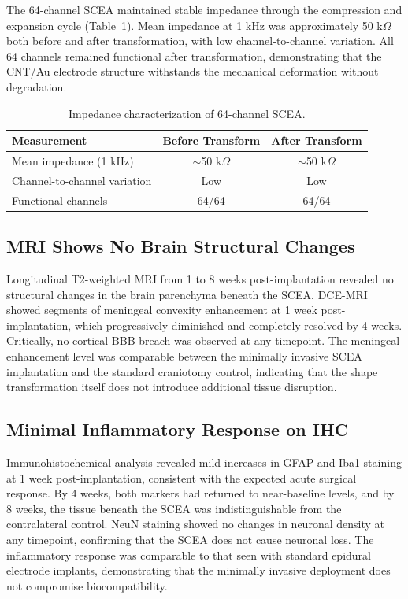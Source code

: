 \documentclass[11pt]{article}
\begin{document}
The 64-channel SCEA maintained stable impedance through the compression and expansion cycle (Table~\ref{tab:impedance}). Mean impedance at 1 kHz was approximately 50 k$\Omega$ both before and after transformation, with low channel-to-channel variation. All 64 channels remained functional after transformation, demonstrating that the CNT/Au electrode structure withstands the mechanical deformation without degradation.

\begin{table}[h]
\centering
\caption{Impedance characterization of 64-channel SCEA.}
\label{tab:impedance}
\begin{tabular}{lcc}
\toprule
Measurement & Before Transform & After Transform \\
\midrule
Mean impedance (1 kHz) & $\sim$50 k$\Omega$ & $\sim$50 k$\Omega$ \\
Channel-to-channel variation & Low & Low \\
Functional channels & 64/64 & 64/64 \\
\bottomrule
\end{tabular}
\end{table}

\subsection{MRI Shows No Brain Structural Changes}

Longitudinal T2-weighted MRI from 1 to 8 weeks post-implantation revealed no structural changes in the brain parenchyma beneath the SCEA. DCE-MRI showed segments of meningeal convexity enhancement at 1 week post-implantation, which progressively diminished and completely resolved by 4 weeks. Critically, no cortical BBB breach was observed at any timepoint. The meningeal enhancement level was comparable between the minimally invasive SCEA implantation and the standard craniotomy control, indicating that the shape transformation itself does not introduce additional tissue disruption.

\subsection{Minimal Inflammatory Response on IHC}

Immunohistochemical analysis revealed mild increases in GFAP and Iba1 staining at 1 week post-implantation, consistent with the expected acute surgical response. By 4 weeks, both markers had returned to near-baseline levels, and by 8 weeks, the tissue beneath the SCEA was indistinguishable from the contralateral control. NeuN staining showed no changes in neuronal density at any timepoint, confirming that the SCEA does not cause neuronal loss. The inflammatory response was comparable to that seen with standard epidural electrode implants, demonstrating that the minimally invasive deployment does not compromise biocompatibility.
\end{document}
